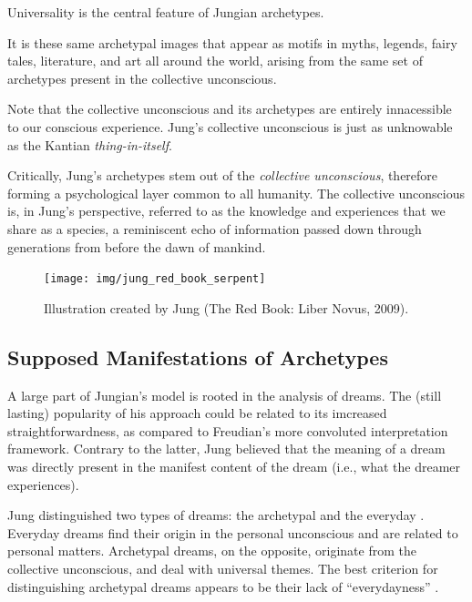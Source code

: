 \documentclass[
]{book}
\begin{document}
Universality is the central feature of Jungian archetypes.

It is these same archetypal images that appear as motifs in myths, legends, fairy tales, literature, and art all around the world, arising from the same set of archetypes present in the collective unconscious.

Note that the collective unconscious and its archetypes are entirely innacessible to our conscious experience. Jung's collective unconscious is just as unknowable as the Kantian \emph{thing-in-itself}.

Critically, Jung's archetypes stem out of the \emph{collective unconscious}, therefore forming a psychological layer common to all humanity. The collective unconscious is, in Jung's perspective, referred to as the knowledge and experiences that we share as a species, a reminiscent echo of information passed down through generations from before the dawn of mankind.

\begin{figure}

{\centering \texttt{[image: img/jung\_red\_book\_serpent]} 

}

\caption{Illustration created by Jung (The Red Book: Liber Novus, 2009).}\label{fig:unnamed-chunk-7}
\end{figure}

\hypertarget{supposed-manifestations-of-archetypes}{%
\subsection{Supposed Manifestations of Archetypes}\label{supposed-manifestations-of-archetypes}}

A large part of Jungian's model is rooted in the analysis of dreams. The (still lasting) popularity of his approach could be related to its imcreased straightforwardness, as compared to Freudian's more convoluted interpretation framework. Contrary to the latter, Jung believed that the meaning of a dream was directly present in the manifest content of the dream (i.e., what the dreamer experiences).

Jung distinguished two types of dreams: the archetypal and the everyday \citep{cann1986jungian}. Everyday dreams find their origin in the personal unconscious and are related to personal matters. Archetypal dreams, on the opposite, originate from the collective unconscious, and deal with universal themes. The best criterion for distinguishing archetypal dreams appears to be their lack of ``everydayness'' \citep{kluger1975archetypal, cann1986jungian}.
\end{document}
